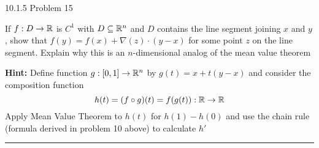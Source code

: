 \documentclass[11pt]{article}
\begin{document}
 10.1.5 Problem 15

If $f: D \to \mathbb{R}$ is $C^1$ with $D \subseteq \mathbb{R}^n$ and $D$ contains the line segment
joining $x$ and $y$, show that $f(y) = f(x) +  \nabla(z) \cdot (y - x)$ for some
point $z$ on the line segment. Explain why this is an $n$-dimensional
analog of the mean value theorem


\textbf{Hint:} Define function $g : [0, 1] \to \mathbb{R}^n$ by $g(t) = x + t(y - x)$
and consider the composition function 
$$h(t) = (f \circ g)(t) = f(g(t)) : \mathbb{R} \to \mathbb{R}$$
Apply Mean Value Theorem to $h(t)$ for $h(1)- h(0)$ and use the chain rule (formula derived
in problem 10 above) to calculate $h'$
\hrule
\end{document}
